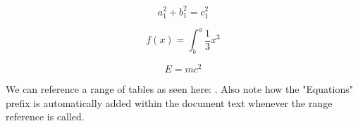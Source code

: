 \begin{equation}
   \label{eq:pythagorean}
   a_1^2 + b_1^2 = c_1^2 
\end{equation}

\begin{equation}
   \label{eq:integral}
   f(x) = \int^a_b \frac{1}{3}x^3
\end{equation}

\begin{equation}
   \label{eq:einstein}
   E = mc^2
\end{equation}

We can reference a range of tables as seen here: .
Also note how the "Equations" prefix is automatically added within the document text whenever the range reference is called.